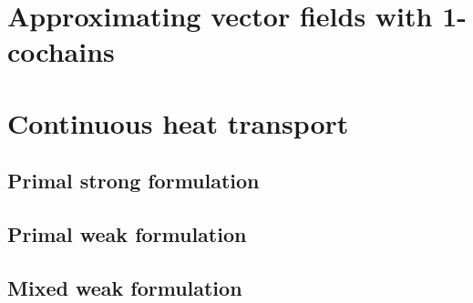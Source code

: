 \documentclass[fleqn]{article}
\theoremstyle{definition}
\begin{document}
\section{Approximating vector fields with 1-cochains}
\label{section:approximating_vector_fields_with_1_cochains}













\section{Continuous heat transport}
\label{section:continuous_heat_transport}


\subsection{Primal strong formulation}


\subsection{Primal weak formulation}
\phantom{T}



\subsection{Mixed weak formulation}
\phantom{T}



\end{document}
